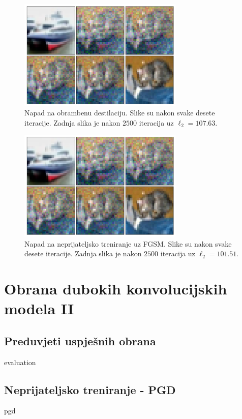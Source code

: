 \documentclass[utf8, diplomski]{fer}
\begin{document}
\begin{figure}[H]
\centering
\includegraphics[width=0.7\textwidth,keepaspectratio]{img/results/boundary_distillation.png}
\caption{Napad na obrambenu destilaciju. Slike su nakon svake desete iteracije. Zadnja slika je nakon $2500$ iteracija uz $\ell_{2} = 107.63$.}
\label{fig:boundary_distillation}
\end{figure}

\begin{figure}[H]
\centering
\includegraphics[width=0.7\textwidth,keepaspectratio]{img/results/boundary_distillation.png}
\caption{Napad na neprijateljsko treniranje uz FGSM. Slike su nakon svake desete iteracije. Zadnja slika je nakon $2500$ iteracija uz $\ell_{2} = 101.51$.}
\label{fig:boundary_fgsm_adv}
\end{figure}


\chapter{Obrana dubokih konvolucijskih modela II}
\section{Preduvjeti uspješnih obrana}\label{preduvjeti}
evaluation\citep{on_evaluating}
\section{Neprijateljsko treniranje - PGD}\label{pgd_adv}
pgd\citep{Madry2017TowardsDL}
\end{document}
